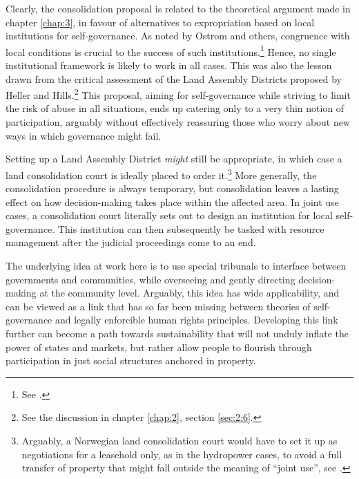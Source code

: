 
Clearly, the consolidation proposal is related to the theoretical argument made in chapter \ref{chap:3}, in favour of alternatives to expropriation based on local institutions for self-governance. As noted by Ostrom and others, congruence with local conditions is crucial to the success of such institutions.\footnote{See \cite[92]{ostrom90}.} Hence, no single institutional framework is likely to work in all cases. This was also the lesson drawn from the critical assessment of the Land Assembly Districts proposed by Heller and Hills.\footnote{See the discussion in chapter \ref{chap:2}, section \ref{sec:2:6}.} This proposal, aiming for self-governance while striving to limit the risk of abuse in all situations, ends up catering only to a very thin notion of participation, arguably without effectively reassuring those who worry about new ways in which governance might fail.

Setting up a Land Assembly District {\it might} still be appropriate, in which case a land consolidation court is ideally placed to order it.\footnote{Arguably, a Norwegian land consolidation court would have to set it up as negotiations for a leasehold only, as in the hydropower cases, to avoid a full transfer of property that might fall outside the meaning of ``joint use'', see \cite{holen95}.} More generally, the consolidation procedure is always temporary, but consolidation leaves a lasting effect on how decision-making takes place within the affected area. In joint use cases, a consolidation court literally sets out to design an institution for local self-governance. This institution can then subsequently be tasked with resource management after the judicial proceedings come to an end. 

The underlying idea at work here is to use special tribunals to interface between governments and communities, while overseeing and gently directing decision-making at the community level. Arguably, this idea has wide applicability, and can be viewed as a link that has so far been missing between theories of self-governance and legally enforcible human rights principles. Developing this link further can become a path towards sustainability that will not unduly inflate the power of states and markets, but rather allow people to flourish through participation in just social structures anchored in property.

